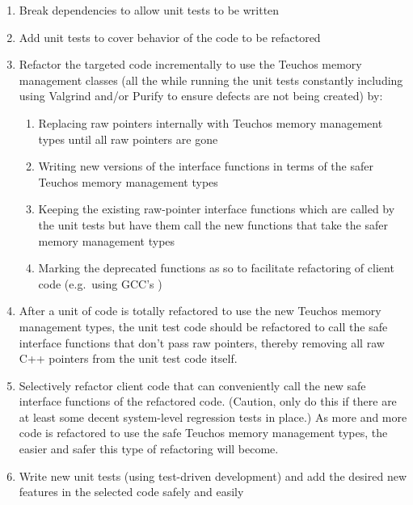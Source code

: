 \documentclass[pdf,ps2pdf,11pt]{SANDreport}
\begin{document}
\begin{enumerate}

{}\item Break dependencies to allow unit tests to be written

{}\item Add unit tests to cover behavior of the code to be refactored

{}\item Refactor the targeted code incrementally to use the Teuchos
memory management classes (all the while running the unit tests
constantly including using Valgrind and/or Purify to ensure defects
are not being created) by:

  \begin{enumerate}

  {}\item Replacing raw pointers internally with Teuchos memory
  management types until all raw pointers are gone

  {}\item Writing new versions of the interface functions in terms of
  the safer Teuchos memory management types

  {}\item Keeping the existing raw-pointer interface functions which
  are called by the unit tests but have them call the new functions
  that take the safer memory management types

  {}\item Marking the deprecated functions as so to facilitate
  refactoring of client code (e.g.\ using GCC's {})

  \end{enumerate}

{}\item After a unit of code is totally refactored to use the new
Teuchos memory management types, the unit test code should be
refactored to call the safe interface functions that don't pass raw
pointers, thereby removing all raw C++ pointers from the unit test
code itself.

{}\item Selectively refactor client code that can conveniently call
the new safe interface functions of the refactored code.  (Caution,
only do this if there are at least some decent system-level regression
tests in place.)  As more and more code is refactored to use the safe
Teuchos memory management types, the easier and safer this type of
refactoring will become.

{}\item Write new unit tests (using test-driven development) and add
the desired new features in the selected code safely and easily

\end{enumerate}
\end{document}
